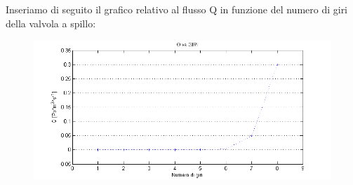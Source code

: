 \documentclass[a4paper,11pt]{article}
\begin{document}
Inseriamo di seguito il grafico relativo al flusso Q in funzione del numero di giri della valvola a spillo:\\ 
 \begin{center} 
\begin{figure}[htpd]
\hspace{-50 pt}
\includegraphics{graficoQ.png}



\end{figure}
\end{center}
\end{document}
